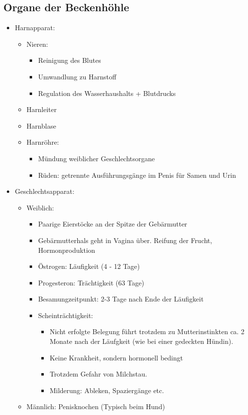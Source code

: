     \subsection{Organe der Beckenhöhle}
    \begin{itemize}
        \item Harnapparat:
        \begin{itemize}
            \item Nieren:
            \begin{itemize}
                \item Reinigung des Blutes
                \item Umwandlung zu Harnstoff
                \item Regulation des Wasserhaushalts + Blutdrucks
            \end{itemize}
            \item Harnleiter
            \item Harnblase
            \item Harnröhre:
            \begin{itemize}
                \item Mündung weiblicher Geschlechtsorgane
                \item Rüden: getrennte Ausführungsgänge im Penis für Samen und Urin
            \end{itemize}
        \end{itemize}
        \item Geschlechtsapparat:
        \begin{itemize}
            \item Weiblich:
            \begin{itemize}
                \item Paarige Eierstöcke an der Spitze der Gebärmutter
                \item Gebärmutterhals geht in Vagina über. Reifung der Frucht, Hormonproduktion
                \item Östrogen: Läufigkeit (4 - 12 Tage)
                \item Progesteron: Trächtigkeit (63 Tage)
                \item Besamungzeitpunkt: 2-3 Tage nach Ende der Läufigkeit
                \item Scheinträchtigkeit:
                \begin{itemize}
                    \item Nicht erfolgte Belegung führt trotzdem zu Mutterinstinkten ca. 2 Monate nach der Läufgkeit (wie bei einer gedeckten Hündin).
                    \item Keine Krankheit, sondern hormonell bedingt
                    \item Trotzdem Gefahr von Milchstau.
                    \item Milderung: Ableken, Spaziergänge etc.
                \end{itemize}
            \end{itemize}
            \item Männlich: Penisknochen (Typisch beim Hund)
        \end{itemize}
    \end{itemize}


